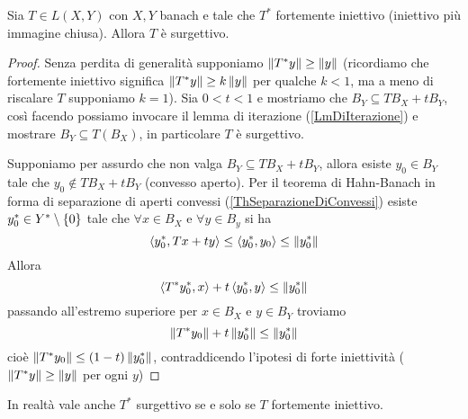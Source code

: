 \begin{theorem}\label{ThSurgettivitaEAggiunti}
Sia $T\in L(X,Y)$ con $X,Y$ banach e tale che $T^\ast$ fortemente iniettivo (iniettivo pi\`u immagine chiusa). Allora $T$ \`e surgettivo.
\end{theorem}
\begin{proof}
Senza perdita di generalit\`a supponiamo $\left\Vert{T^\ast y}\right\Vert\geq \left\Vert{y}\right\Vert$ (ricordiamo che fortemente iniettivo significa $\left\Vert{T^\ast y}\right\Vert\geq k\left\Vert{y}\right\Vert$ per qualche $k<1$, ma a meno di riscalare $T$ supponiamo $k=1$). Sia $0<t<1$ e mostriamo che $B_Y\subseteq TB_X+tB_Y$, cos\`i facendo possiamo invocare il lemma di iterazione (\ref{LmDiIterazione}) e mostrare $B_Y\subseteq T(B_X)$, in particolare $T$ \`e surgettivo.

Supponiamo per assurdo che non valga $B_Y\subseteq TB_X+tB_Y$, allora esiste $y_0\in B_Y$ tale che $y_0\notin TB_X+tB_Y$ (convesso aperto). Per il teorema di Hahn-Banach in forma di separazione di aperti convessi (\ref{ThSeparazioneDiConvessi}) esiste $y^\ast_0\in Y^\ast\setminus\{0\}$ tale che $\forall x\in B_X$ e $\forall y\in B_y$ si ha
\[\left\langle {y^\ast_0,Tx+ty}\right\rangle\leq \left\langle {y^\ast_0,y_0}\right\rangle\leq \left\Vert{y^\ast_0}\right\Vert\]
Allora
\[\left\langle {T^\ast y_0^\ast,x}\right\rangle+t\left\langle {y_0^\ast,y}\right\rangle\leq \left\Vert{y_0^\ast}\right\Vert\]
passando all'estremo superiore per $x\in B_X$ e $y\in B_Y$ troviamo
\[\left\Vert{T^\ast y_0}\right\Vert+t\left\Vert{y^\ast_0}\right\Vert\leq\left\Vert{y_0^\ast}\right\Vert\]
cio\`e $\left\Vert{T^\ast y_0}\right\Vert\leq (1-t)\left\Vert{y^\ast_0}\right\Vert$, contraddicendo l'ipotesi di forte iniettivit\`a ($\left\Vert{T^\ast y}\right\Vert\geq \left\Vert{y}\right\Vert$ per ogni $y$)
\end{proof}

\begin{remark}
In realt\`a vale anche $T^\ast$ surgettivo se e solo se $T$ fortemente iniettivo.
\end{remark}

